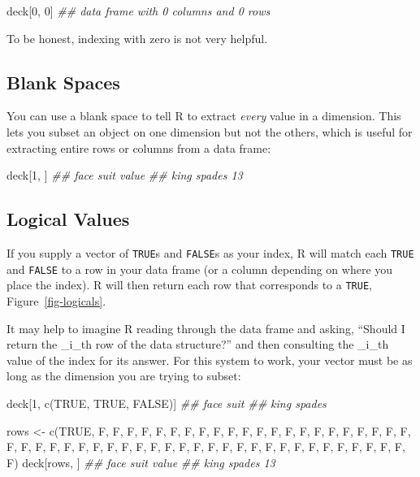 \documentclass[
  letterpaper,
  DIV=11,
  numbers=noendperiod]{scrbook}
\newenvironment{Shaded}{\begin{snugshade}}{\end{snugshade}}
\newcommand{\ConstantTok}[1]{\textcolor[rgb]{0.56,0.35,0.01}{#1}}
\newcommand{\DecValTok}[1]{\textcolor[rgb]{0.68,0.00,0.00}{#1}}
\newcommand{\DocumentationTok}[1]{\textcolor[rgb]{0.37,0.37,0.37}{\textit{#1}}}
\newcommand{\FunctionTok}[1]{\textcolor[rgb]{0.28,0.35,0.67}{#1}}
\newcommand{\NormalTok}[1]{\textcolor[rgb]{0.00,0.23,0.31}{#1}}
\newcommand{\OtherTok}[1]{\textcolor[rgb]{0.00,0.23,0.31}{#1}}
\begin{document}
\begin{Shaded}
\begin{Highlighting}[]
\NormalTok{deck[}\DecValTok{0}\NormalTok{, }\DecValTok{0}\NormalTok{]}
\DocumentationTok{\#\# data frame with 0 columns and 0 rows}
\end{Highlighting}
\end{Shaded}

To be honest, indexing with zero is not very helpful.

\subsection{Blank Spaces}\label{blank-spaces}

You can use a blank space to tell R to extract \emph{every} value in a
dimension. This lets you subset an object on one dimension but not the
others, which is useful for extracting entire rows or columns from a
data frame:

\begin{Shaded}
\begin{Highlighting}[]
\NormalTok{deck[}\DecValTok{1}\NormalTok{, ]}
\DocumentationTok{\#\# face   suit value}
\DocumentationTok{\#\# king spades    13}
\end{Highlighting}
\end{Shaded}

\subsection{Logical Values}\label{logic}

If you supply a vector of \texttt{TRUE}s and \texttt{FALSE}s as your
index, R will match each \texttt{TRUE} and \texttt{FALSE} to a row in
your data frame (or a column depending on where you place the index). R
will then return each row that corresponds to a \texttt{TRUE},
Figure~\ref{fig-logicals}.

It may help to imagine R reading through the data frame and asking,
``Should I return the \_i\_th row of the data structure?'' and then
consulting the \_i\_th value of the index for its answer. For this
system to work, your vector must be as long as the dimension you are
trying to subset:

\begin{Shaded}
\begin{Highlighting}[]
\NormalTok{deck[}\DecValTok{1}\NormalTok{, }\FunctionTok{c}\NormalTok{(}\ConstantTok{TRUE}\NormalTok{, }\ConstantTok{TRUE}\NormalTok{, }\ConstantTok{FALSE}\NormalTok{)]}
\DocumentationTok{\#\# face   suit }
\DocumentationTok{\#\# king spades}

\NormalTok{rows }\OtherTok{\textless{}{-}} \FunctionTok{c}\NormalTok{(}\ConstantTok{TRUE}\NormalTok{, F, F, F, F, F, F, F, F, F, F, F, F, F, F, F, }
\NormalTok{  F, F, F, F, F, F, F, F, F, F, F, F, F, F, F, F, F, F, F, F, F, F, }
\NormalTok{  F, F, F, F, F, F, F, F, F, F, F, F, F, F)}
\NormalTok{deck[rows, ]}
\DocumentationTok{\#\# face   suit value}
\DocumentationTok{\#\# king spades    13}
\end{Highlighting}
\end{Shaded}
\end{document}

